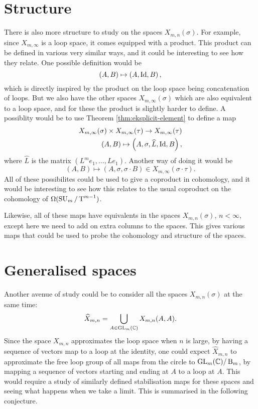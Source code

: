 \section{Structure}

There is also more structure to study on the spaces
$X_{m,n}(\sigma)$. For example, since $X_{m,\infty}$ is a
loop space, it comes equipped with a product. This product can be
defined in various very similar ways, and it could be interesting to
see how they relate. One possible definition would be
\[ (A,B) \mapsto \left(A,\operatorname{Id}, B\right), \]
which is directly inspired by the product on the loop space being
concatenation of loops. But we also have the other spaces
$X_{m,\infty}(\sigma)$ which are also equivalent to a loop space, and
for these the product is slightly harder to define. A possiblity would
be to use Theorem \ref{thm:eksplicit-element} to define a map
\begin{align*}
  X_{m,\infty}(\sigma) \times X_{m,\infty}(\tau) \to
  X_{m,\infty}(\tau) \\
  (A,B) \mapsto \left(A,\sigma,\widehat{L},\operatorname{Id},B\right),
\end{align*}
where $\widehat{L}$ is the matrix $(L^m e_1,\dots,Le_1)$. Another way
of doing it would be
\[ (A,B) \mapsto \left(A,\sigma,\sigma\cdot B\right) \in
X_{m,\infty}(\sigma\cdot\tau). \]
All of these possibilites could be used to give a coproduct in
cohomology, and it would be interesting to see how this relates to the
usual coproduct on the cohomology of $\Omega(\operatorname{SU}_{m}/\operatorname{T}^{m-1})$.

Likewise, all of these maps have equivalents in the spaces
$X_{m,n}(\sigma)$, $n < \infty$, except here we
need to add on extra columns to the spaces. This gives various maps
that could be used to probe the cohomology and structure of the
spaces.

\section{Generalised spaces}

Another avenue of study could be to consider all the spaces
$X_{m,n}(\sigma)$ at the same time:
\[ \widehat{X}_{m,n} = \bigcup_{A \in \operatorname{GL}_m(\mathbb{C})} X_{m,n}(A,A). \]
Since the space $X_{m,n}$ approximates the loop space when $n$ is
large, by having a sequence of vectors map to a loop at the identity,
one could expect $\widehat{X}_{m,n}$ to approximate the free loop
group of all maps from the circle to $\operatorname{GL}_m(\mathbb{C})/\operatorname{B}_m$, by mapping a
sequence of vectors starting and ending at $A$ to a loop at $A$. This
would require a study of similarly defined stabilisation maps for
these spaces and seeing what happens when we take a limit. This
is summarised in the following conjecture.

